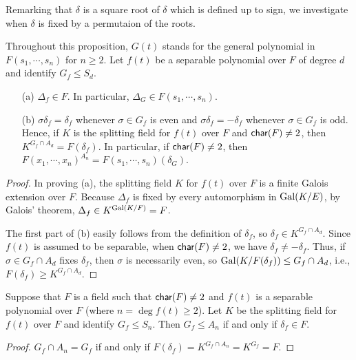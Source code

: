 Remarking that $\delta$ is a square root of $\delta$ which is defined up to sign, we investigate when $\delta$ is fixed by a permutaion of the roots.
\begin{prop}
    Throughout this proposition, $G(t)$ stands for the general polynomial in $F(s_1, \cdots, s_n)$ for $n\geq 2$.
    Let $f(t)$ be a separable polynomial over $F$ of degree $d$ and identify $G_f\leq S_d$.
    \begin{enumerate}
        \item[(a)]
        {
            $\Delta_f\in F$.
            In particular, $\Delta_G\in F(s_1, \cdots, s_n)$.
        }
        \item[(b)]
        {
            $\sigma\delta_f=\delta_f$ whenever $\sigma\in G_f$ is even and $\sigma\delta_f=-\delta_f$ whenever $\sigma\in G_f$ is odd.
            Hence, if $K$ is the splitting field for $f(t)$ over $F$ and \color{teal}${\textsf{char}({F})}\neq 2$\color{black}, then $K^{G_f\cap A_d}=F(\delta_f)$.
            In particular, if ${\textsf{char}({F})}\neq 2$, then $F(x_1, \cdots, x_n)^{A_n}=F(s_1, \cdots, s_n)(\delta_G)$.
        }
    \end{enumerate}
\end{prop}
\begin{proof}
    In proving (a), the splitting field $K$ for $f(t)$ over $F$ is a finite Galois extension over $F$.
    Because $\Delta_f$ is fixed by every automorphism in ${\textrm{Gal}({K/E})}$, by Galois' theorem, $\Delta_f\in K^{\textrm{Gal}({K/F})}=F$.

    The first part of (b) easily follows from the definition of $\delta_f$, so $\delta_f\in K^{G_f\cap A_d}$.
    Since $f(t)$ is assumed to be separable, when ${\textsf{char}({F})}\neq 2$, we have $\delta_f\neq-\delta_f$.
    Thus, if $\sigma\in G_f\cap A_d$ fixes $\delta_f$, then $\sigma$ is necessarily even, so ${\textrm{Gal}({K/F(\delta_f)})}\leq G_f\cap A_d$, i.e., $F(\delta_f)\geq K^{G_f\cap A_d}$.
\end{proof}
\begin{cor}
    Suppose that $F$ is a field such that ${\textsf{char}({F})}\neq 2$ and $f(t)$ is a separable polynomial over $F$ (where $n=\deg f(t)\geq 2$).
    Let $K$ be the splitting field for $f(t)$ over $F$ and identify $G_f\leq S_n$.
    Then $G_f\leq A_n$ if and only if $\delta_f\in F$.
\end{cor}
\begin{proof}
    $G_f\cap A_n=G_f$ if and only if $F(\delta_f)=K^{G_f\cap A_n}=K^{G_f}=F$.
\end{proof}

